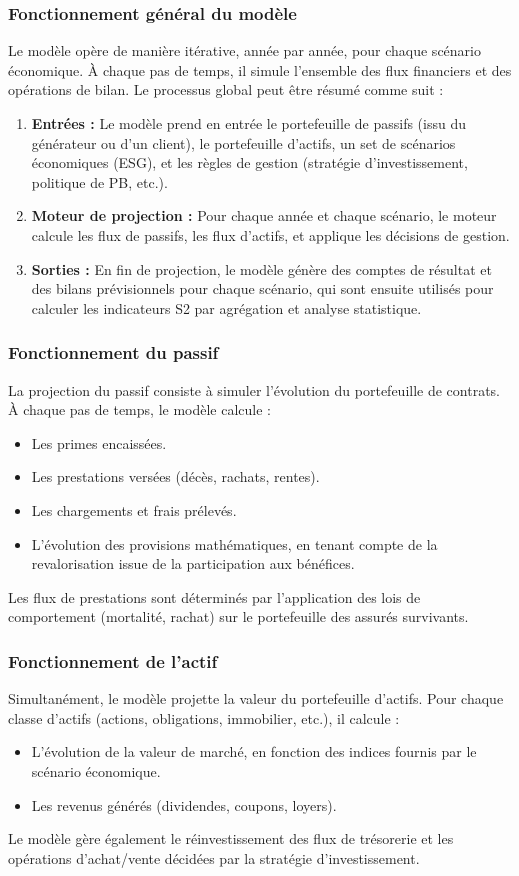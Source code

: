 \subsubsection{Fonctionnement général du modèle}
Le modèle opère de manière itérative, année par année, pour chaque scénario économique. À chaque pas de temps, il simule l'ensemble des flux financiers et des opérations de bilan. Le processus global peut être résumé comme suit :
\begin{enumerate}
    \item \textbf{Entrées :} Le modèle prend en entrée le portefeuille de passifs (issu du générateur ou d'un client), le portefeuille d'actifs, un set de scénarios économiques (ESG), et les règles de gestion (stratégie d'investissement, politique de PB, etc.).
    \item \textbf{Moteur de projection :} Pour chaque année et chaque scénario, le moteur calcule les flux de passifs, les flux d'actifs, et applique les décisions de gestion.
    \item \textbf{Sorties :} En fin de projection, le modèle génère des comptes de résultat et des bilans prévisionnels pour chaque scénario, qui sont ensuite utilisés pour calculer les indicateurs S2 par agrégation et analyse statistique.
\end{enumerate}

\subsubsection{Fonctionnement du passif}
La projection du passif consiste à simuler l'évolution du portefeuille de contrats. À chaque pas de temps, le modèle calcule :
\begin{itemize}
    \item Les primes encaissées.
    \item Les prestations versées (décès, rachats, rentes).
    \item Les chargements et frais prélevés.
    \item L'évolution des provisions mathématiques, en tenant compte de la revalorisation issue de la participation aux bénéfices.
\end{itemize}
Les flux de prestations sont déterminés par l'application des lois de comportement (mortalité, rachat) sur le portefeuille des assurés survivants.

\subsubsection{Fonctionnement de l'actif}
Simultanément, le modèle projette la valeur du portefeuille d'actifs. Pour chaque classe d'actifs (actions, obligations, immobilier, etc.), il calcule :
\begin{itemize}
    \item L'évolution de la valeur de marché, en fonction des indices fournis par le scénario économique.
    \item Les revenus générés (dividendes, coupons, loyers).
\end{itemize}
Le modèle gère également le réinvestissement des flux de trésorerie et les opérations d'achat/vente décidées par la stratégie d'investissement.

